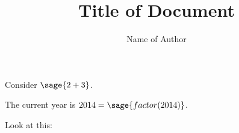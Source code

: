 \documentclass{article}
\title{Title of Document}
\author{Name of Author}
\begin{document}
\maketitle

Consider $\sage{2+3}$.

The current year is $2014=\sage{factor(2014)}$.

Look at this:
\end{document}
